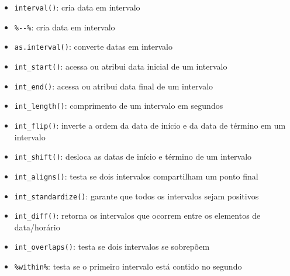 \documentclass[
]{book}
\providecommand{\tightlist}{%
  \setlength{\itemsep}{0pt}\setlength{\parskip}{0pt}}
\begin{document}
\begin{itemize}
\tightlist
\item
  \texttt{interval()}: cria data em intervalo
\item
  \texttt{\%-\/-\%}: cria data em intervalo
\item
  \texttt{as.interval()}: converte datas em intervalo
\item
  \texttt{int\_start()}: acessa ou atribui data inicial de um intervalo
\item
  \texttt{int\_end()}: acessa ou atribui data final de um intervalo
\item
  \texttt{int\_length()}: comprimento de um intervalo em segundos
\item
  \texttt{int\_flip()}: inverte a ordem da data de início e da data de término em um intervalo
\item
  \texttt{int\_shift()}: desloca as datas de início e término de um intervalo
\item
  \texttt{int\_aligns()}: testa se dois intervalos compartilham um ponto final
\item
  \texttt{int\_standardize()}: garante que todos os intervalos sejam positivos
\item
  \texttt{int\_diff()}: retorna os intervalos que ocorrem entre os elementos de data/horário
\item
  \texttt{int\_overlaps()}: testa se dois intervalos se sobrepõem
\item
  \texttt{\%within\%}: testa se o primeiro intervalo está contido no segundo
\end{itemize}
\end{document}
